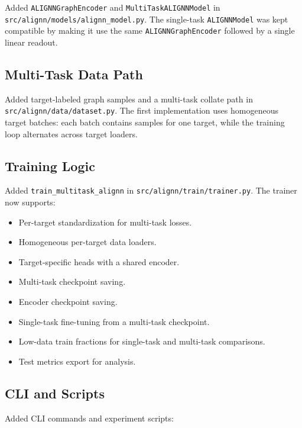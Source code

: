 \documentclass[11pt,a4paper]{article}
\begin{document}
Added \texttt{ALIGNNGraphEncoder} and \texttt{MultiTaskALIGNNModel} in \texttt{src/alignn/models/alignn\_model.py}.  The single-task \texttt{ALIGNNModel} was kept compatible by making it use the same \texttt{ALIGNNGraphEncoder} followed by a single linear readout.

\subsection{Multi-Task Data Path}

Added target-labeled graph samples and a multi-task collate path in \texttt{src/alignn/data/dataset.py}.  The first implementation uses homogeneous target batches: each batch contains samples for one target, while the training loop alternates across target loaders.

\subsection{Training Logic}

Added \texttt{train\_multitask\_alignn} in \texttt{src/alignn/train/trainer.py}.  The trainer now supports:

\begin{itemize}
  \item Per-target standardization for multi-task losses.
  \item Homogeneous per-target data loaders.
  \item Target-specific heads with a shared encoder.
  \item Multi-task checkpoint saving.
  \item Encoder checkpoint saving.
  \item Single-task fine-tuning from a multi-task checkpoint.
  \item Low-data train fractions for single-task and multi-task comparisons.
  \item Test metrics export for analysis.
\end{itemize}

\subsection{CLI and Scripts}

Added CLI commands and experiment scripts:
\end{document}
